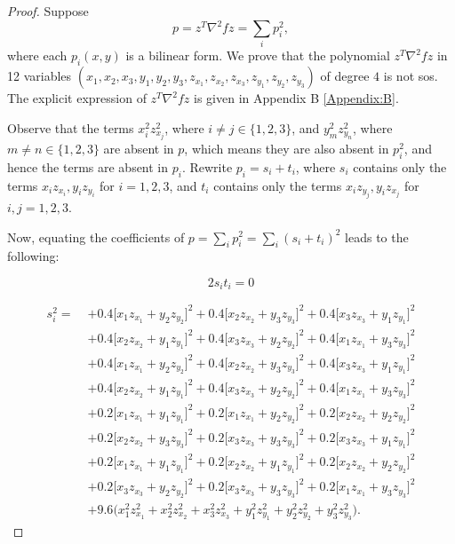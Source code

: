 \documentclass[10pt,a4paper]{amsart}
\begin{document}
\begin{proof}

Suppose 
\[
p = z^T \nabla^2 f z = \sum_i p_i^2,
\]
where each $p_i(x,y)$ is a bilinear form. We prove that the polynomial $z^T \nabla^2 f z$ in 12 variables $(x_1,x_2,x_3,y_1,y_2,y_3,z_{x_1},z_{x_2},z_{x_3},z_{y_1},z_{y_2},z_{y_3})$ of degree $4$ is not sos. The explicit expression of $z^T \nabla^2 f z$ is given in Appendix B \ref{Appendix:B}.

Observe that the terms $x_i^2 z_{x_j}^{2}$, where $i\neq j \in \{1,2,3\}$, and $y_m^2 z_{y_n}^{2}$, where $m\neq n \in \{1,2,3\}$ are absent in $p$, which means they are also absent in $p_i^2$, and hence the terms are absent in $p_i$. Rewrite $p_i = s_i + t_i$, where $s_i$ contains only the terms $x_i z_{x_i}, y_i z_{y_i}$ for $i=1,2,3$, and $t_i$ contains only the terms $x_i z_{y_j}, y_iz_{x_j}$ for $i,j =1,2,3$.

Now, equating the coefficients of $p = \sum_i p_i^2 = \sum_i (s_i + t_i)^2$ leads to the following:

\[
    2s_i t_i =0
\]

\begin{align*}
    s_i^2 =\; &+ 0.4\Big[x_1z_{x_1} + y_2z_{y_2}\Big]^2
+ 0.4\Big[x_2z_{x_2} + y_3z_{y_3}\Big]^2
+ 0.4\Big[x_3z_{x_3} + y_1z_{y_1}\Big]^2 \\
&+ 0.4\Big[x_2z_{x_2} + y_1z_{y_1}\Big]^2
+ 0.4\Big[x_3z_{x_3} + y_2z_{y_2}\Big]^2
+ 0.4\Big[x_1z_{x_1} + y_3z_{y_3}\Big]^2 \\
&+ 0.4\Big[x_1z_{x_1} + y_2z_{y_2}\Big]^2
+ 0.4\Big[x_2z_{x_2} + y_3z_{y_3}\Big]^2
+ 0.4\Big[x_3z_{x_3} + y_1z_{y_1}\Big]^2 \\
&+ 0.4\Big[x_2z_{x_2} + y_1z_{y_1}\Big]^2
+ 0.4\Big[x_3z_{x_3} + y_2z_{y_2}\Big]^2
+ 0.4\Big[x_1z_{x_1} + y_3z_{y_3}\Big]^2 \\
&+ 0.2\Big[x_1z_{x_1} + y_1z_{y_1}\Big]^2
+ 0.2\Big[x_1z_{x_1} + y_2z_{y_2}\Big]^2
+ 0.2\Big[x_2z_{x_2} + y_2z_{y_2}\Big]^2 \\
&+ 0.2\Big[x_2z_{x_2} + y_3z_{y_3}\Big]^2
+ 0.2\Big[x_3z_{x_3} + y_3z_{y_3}\Big]^2
+ 0.2\Big[x_3z_{x_3} + y_1z_{y_1}\Big]^2 \\
&+ 0.2\Big[x_1z_{x_1} + y_1z_{y_1}\Big]^2
+ 0.2\Big[x_2z_{x_2} + y_1z_{y_1}\Big]^2
+ 0.2\Big[x_2z_{x_2} + y_2z_{y_2}\Big]^2 \\
&+ 0.2\Big[x_3z_{x_3} + y_2z_{y_2}\Big]^2
+ 0.2\Big[x_3z_{x_3} + y_3z_{y_3}\Big]^2
+ 0.2\Big[x_1z_{x_1} + y_3z_{y_3}\Big]^2 \\
&+ 9.6\Big(x_1^2z_{x_1}^2 + x_2^2z_{x_2}^2 + x_3^2z_{x_3}^2
+ y_1^2z_{y_1}^2 + y_2^2z_{y_2}^2 + y_3^2z_{y_3}^2\Big).
    \end{align*}


\end{proof}
\end{document}
